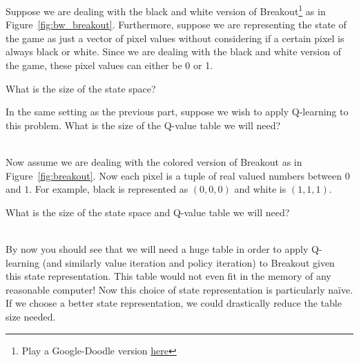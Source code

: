 \documentclass[11pt,addpoints,answers]{exam}
\begin{document}
\begin{questions}
    \question[1] Suppose we are dealing with the black and white version of Breakout\footnote{Play a Google-Doodle version \href{http://goo.gl/hb5xa}{here}} as in Figure~\ref{fig:bw_breakout}. Furthermore, suppose we are representing the state of the game as just a vector of pixel values without considering if a certain pixel is always black or white. Since we are dealing with the black and white version of the game, these pixel values can either be 0 or 1.
    
    What is the size of the state space?\\
    \begin{your_solution}[title = Answer, height=2cm,width=3cm]
    \end{your_solution}
    
    
    \question[1] In the same setting as the previous part, suppose we wish to apply Q-learning to this problem. What is the size of the Q-value table we will need?\\
    \begin{your_solution}[title =Answer, height=2cm,width=3cm]
    \end{your_solution}\\
    
    
    
    \question[1] Now assume we are dealing with the colored version of Breakout as in Figure~\ref{fig:breakout}. Now each pixel is a tuple of real valued numbers between $0$ and $1$. For example, black is represented as $(0, 0, 0)$ and white is $(1, 1, 1)$. 
    
    What is the size of the state space and Q-value table we will need?
    \\
    \begin{your_solution}[title=Answer,height=2cm,width=15cm]
    \end{your_solution}\\
    
    
    By now you should see that we will need a huge table in order to apply Q-learning (and similarly value iteration and policy iteration) to Breakout given this state representation. This table would not even fit in the memory of any reasonable computer! Now this choice of state representation is particularly na\"ive. If we choose a better state representation, we could drastically reduce the table size needed. 
    

\end{questions}
\end{document}
